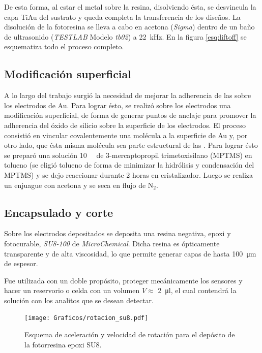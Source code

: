 		 De esta forma, al estar el metal sobre la resina, disolviendo ésta, se desvincula la capa Ti\textbar Au del sustrato y queda completa la transferencia de los diseños. 
		 La disolución de la fotoresina se lleva a cabo en acetona (\textit{Sigma}) dentro de un baño de ultrasonido (\textit{TESTLAB} Modelo \textit{tb02}) a \SI{22}{\kHz}. En la figura \ref{esq:liftoff} se esquematiza todo el proceso completo.

	\subsection{Modificación superficial}\label{sec:silanizacion}
		
		A lo largo del trabajo surgió la necesidad de mejorar la adherencia de las \pdm\space sobre los electrodos de Au. Para lograr ésto, se realizó sobre los electrodos una modificación superficial, de forma de generar puntos de anclaje para promover la adherencia del óxido de silicio sobre la superficie de los electrodos.
		El proceso consistió en vincular covalentemente una molécula a la superficie de Au y, por otro lado, que ésta misma molécula sea parte estructural de las \pdm. Para lograr ésto se preparó una solución \SI{10}{\milli\Molar} de 3-mercaptopropil trimetoxisilano (MPTMS) en tolueno (se eligió tolueno de forma de minimizar la hidrólisis y condensación del MPTMS) y se dejo reaccionar durante 2 horas en cristalizador. \cite{Goss1991,Herzog2013} Luego se realiza un enjuague con acetona y se seca en flujo de N$_2$.

	\subsection{Encapsulado y corte}\label{sec:corte}

		Sobre los electrodos depositados se deposita una resina negativa, epoxi y fotocurable, \textit{SU8-100} de \textit{MicroChemical}\cite{MicrochemicalsTeam2009}. Dicha resina es ópticamente transparente y de alta viscosidad, lo que permite generar capas de hasta \SI{100}{\um} de espesor. 

		Fue utilizada con un doble propósito, proteger mecánicamente los sensores y hacer un reservorio o celda con un volumen  $V \approx$ \SI{2}{\ul}, el cual contendrá la solución con los analitos que se desean detectar.  
			\begin{figure}[ht]
			 		  \begin{center}
			 		  \texttt{[image: Graficos/rotacion\_su8.pdf]}
			 		  \caption[Parámetros de depósito para la resina epoxi]{Esquema de aceleración y velocidad de rotación para el depósito de la fotorresina epoxi SU8.}
			 		  \label{fig:spin-su8}
			 		  \end{center}
			 		  \end{figure}
	
